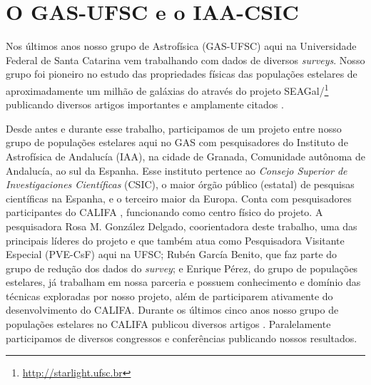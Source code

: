 \section{O GAS-UFSC e o IAA-CSIC}
\label{sec:intro:UFSCeIAA}

Nos últimos anos nosso grupo de Astrofísica (GAS-UFSC) aqui na Universidade Federal de Santa Catarina vem trabalhando com dados de diversos {\em surveys}. Nosso grupo foi pioneiro no estudo das propriedades físicas das populações estelares de aproximadamente um milhão de galáxias do \SDSS através do projeto SEAGal/\starlight\footnote{\href{http://starlight.ufsc.br}{http://starlight.ufsc.br}} publicando diversos artigos importantes e amplamente citados \citep[e.g., ][]{CidFernandes.etal.2005a, Mateus.etal.2006a, Stasinska.etal.2006a, Asari.etal.2007a, Stasinska.etal.2008a, CidFernandes.etal.2011a}.

Desde antes e durante esse trabalho, participamos de um projeto entre nosso grupo de populações estelares aqui no GAS com pesquisadores do Instituto de Astrofísica de Andalucía (IAA), na cidade de Granada, Comunidade autônoma de Andalucía, ao sul da Espanha. Esse instituto pertence ao {\em Consejo Superior de Investigaciones Científicas} (CSIC), o maior órgão público (estatal) de pesquisas científicas na Espanha, e o terceiro maior da Europa. Conta com pesquisadores participantes do CALIFA \citep[][]{Sanchez.etal.2012a}, funcionando como centro físico do projeto. A pesquisadora Rosa M. González Delgado, coorientadora deste trabalho, uma das principais líderes do projeto e que também atua como Pesquisadora Visitante Especial (PVE-CsF) aqui na UFSC; Rubén García Benito, que faz parte do grupo de redução dos dados do {\em survey}; e Enrique Pérez, do grupo de populações estelares, já trabalham em nossa parceria e possuem conhecimento e domínio das técnicas exploradas por nosso projeto, além de participarem ativamente do desenvolvimento do CALIFA. Durante os últimos cinco anos nosso grupo de populações estelares no CALIFA publicou diversos artigos \citep[e.g.,][]{Perez.etal.2013a, GonzalezDelgado.etal.2014a, GonzalezDelgado.etal.2014b, GonzalezDelgado.etal.2015a, GonzalezDelgado.etal.2016a, deAmorim.etal.2017, GonzalezDelgado.etal.2017, RGB.etal.2017, Lacerda.etal.2017}. Paralelamente participamos de diversos congressos e conferências publicando nossos resultados.











